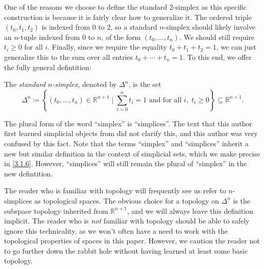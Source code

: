One of the reasons we choose to define the standard 2-simplex as this specific construction is because it is fairly clear how to generalize it. The ordered triple $(t_0,t_1,t_2)$ is indexed from 0 to 2, so a standard $n$-simplex should likely involve an $n$-tuple indexed from $0$ to $n$, of the form $(t_0,\ldots,t_n)$. We should still require $t_i\geq 0$ for all $i$. Finally, since we require the equality $t_0+t_1+t_2=1$, we can just generalize this to the sum over all entries $t_0+\cdots+t_n=1$. To this end, we offer the fully general defintition:
\begin{definition}\label{2.1.1}
    The \emph{standard $n$-simplex}, denoted by $\Delta^n$, is the set
    \[
    \Delta^n\coloneqq \left\{(t_0,\ldots,t_n)\in\mathbb{R}^{n+1}\mid\sum_{i=0}^n t_i = 1 \text{ and for all } i,\; t_i\geq 0\right\}\subseteq\mathbb{R}^{n+1}.
    \]
\end{definition}

\begin{terminology}\label{2.1.2}
    The plural form of the word ``simplex'' is ``simplices''. The text that this author first learned simplicial objects from did not clarify this, and this author was very confused by this fact. Note that the terms ``simplex'' and ``simplices'' inherit a new but similar definition in the context of simplicial sets, which we make precise in \cref{3.1.6}. However, ``simplices'' will still remain the plural of ``simplex'' in the new defintition.
\end{terminology}

\begin{remark}\label{2.1.3}
    The reader who is familiar with topology will frequently see us refer to $n$-simplices as topological spaces. The obvious choice for a topology on $\Delta^n$ is the subspace topology inherited from $\mathbb{R}^{n+1}$, and we will always leave this definition implicit. The reader who is \emph{not} familiar with topology should be able to safely ignore this technicality, as we won't often have a need to work with the topological properties of spaces in this paper. However, we caution the reader not to go further down the rabbit hole without having learned at least some basic topology.
\end{remark}

